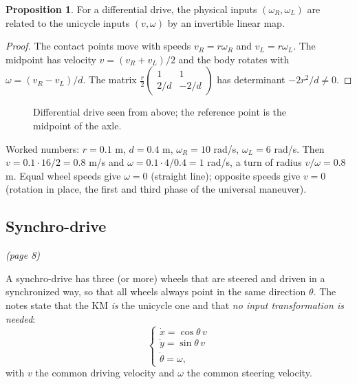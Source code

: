 \documentclass[11pt,a4paper]{article}
\theoremstyle{definition}
\newtheorem{proposition}[theorem]{Proposition}
\begin{document}
\begin{proposition}
For a differential drive, the physical inputs $(\omega_R,\omega_L)$ are related to the unicycle inputs $(v,\omega)$ by an invertible linear map.
\end{proposition}
\begin{proof}
The contact points move with speeds $v_R=r\omega_R$ and $v_L=r\omega_L$. The midpoint has velocity $v=(v_R+v_L)/2$ and the body rotates with $\omega=(v_R-v_L)/d$. The matrix $\frac r2\begin{pmatrix}1&1\\ 2/d&-2/d\end{pmatrix}$ has determinant $-2r^2/d\neq0$.
\end{proof}

\begin{figure}[h]
\centering
{}
\caption{Differential drive seen from above; the reference point is the midpoint of the axle.}
\end{figure}

\begin{intuition}
Worked numbers: $r=0.1$ m, $d=0.4$ m, $\omega_R=10$ rad/s, $\omega_L=6$ rad/s. Then $v=0.1\cdot16/2=0.8$ m/s and $\omega=0.1\cdot4/0.4=1$ rad/s, a turn of radius $v/\omega=0.8$ m. Equal wheel speeds give $\omega=0$ (straight line); opposite speeds give $v=0$ (rotation in place, the first and third phase of the universal maneuver).
\end{intuition}

\subsection{Synchro-drive}\emph{(page 8)}

A synchro-drive has three (or more) wheels that are steered and driven in a synchronized way, so that all wheels always point in the same direction $\theta$. The notes state that the KM \emph{is} the unicycle one and that \emph{no input transformation is needed}:
\[
\begin{cases}\dot x=\cos\theta\,v\\ \dot y=\sin\theta\,v\\ \dot\theta=\omega ,\end{cases}
\]
with $v$ the common driving velocity and $\omega$ the common steering velocity.
\end{document}
